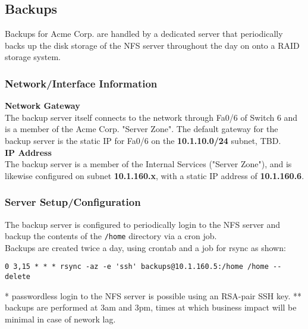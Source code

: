 \subsection{Backups} \label{backups}
Backups for Acme Corp. are handled by a dedicated server that periodically 
backs up the disk storage of the NFS server throughout the day on onto a RAID 
storage system.

\subsubsection{Network/Interface Information}
\textbf{Network Gateway} \\
The backup server itself connects to the network through Fa0/6 of Switch 6 and 
is a member of the Acme Corp. "Server Zone". The default gateway for the backup 
server is the static IP for Fa0/6 on the \textbf{10.1.10.0/24} subnet, TBD. \\

\noindent
\textbf{IP Address} \\
The backup server is a member of the Internal Services ("Server Zone"), and is
likewise configured on subnet \textbf{10.1.160.x}, with a static IP address of 
\textbf{10.1.160.6}. \\

\subsubsection{Server Setup/Configuration}
The backup server is configured to periodically login to the NFS server and
backup the contents of the \lstinline$/home$ directory via a cron job. \\

\noindent
Backups are created twice a day, using crontab and a job for rsync as shown: \\

\begin{lstlisting}[backgroundcolor=\color{Gray}]
 0 3,15 * * * rsync -az -e 'ssh' backups@10.1.160.5:/home /home --delete
\end{lstlisting}
\vspace{1em}
* passwordless login to the NFS server is possible using an RSA-pair SSH key.
** backups are performed at 3am and 3pm, times at which business impact will 
be minimal in case of nework lag.
